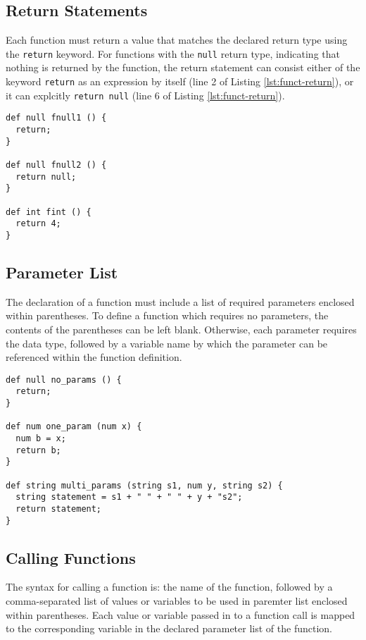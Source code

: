 \documentclass{article}
\newcommand{\code}[1]{\texttt{#1}} %
\begin{document}
\subsection{Return Statements}

Each function must return a value that matches the declared return type using the \code{return} keyword. For functions with the \code{null} return type, indicating that nothing is returned by the function, the return statement can consist either of the keyword \code{return} as an expression by itself (line 2 of Listing \ref{lst:funct-return}), or it can explcitly \code{return null} (line 6 of Listing \ref{lst:funct-return}).

\begin{lstlisting}[language=pltLang, caption=Return statements of functions., label=lst:funct-return]
def null fnull1 () {
  return;
}

def null fnull2 () {
  return null;
}

def int fint () {
  return 4;
}
\end{lstlisting}

\subsection{Parameter List}

The declaration of a function must include a list of required parameters enclosed within parentheses. To define a function which requires no parameters, the contents of the parentheses can be left blank. Otherwise, each parameter requires the data type, followed by a variable name by which the parameter can be referenced within the function definition. 

\begin{lstlisting}[language=pltLang, caption=Parameters in function declarations., label=lst:funct-params]
def null no_params () {
  return;
}

def num one_param (num x) {
  num b = x;
  return b;
}

def string multi_params (string s1, num y, string s2) {
  string statement = s1 + " " + " " + y + "s2";
  return statement;
}

\end{lstlisting}

\subsection{Calling Functions}

The syntax for calling a function is: the name of the function, followed by a comma-separated list of values or variables to be used in paremter list enclosed within parentheses. Each value or variable passed in to a function call is mapped to the corresponding variable in the declared parameter list of the function.
\end{document}
